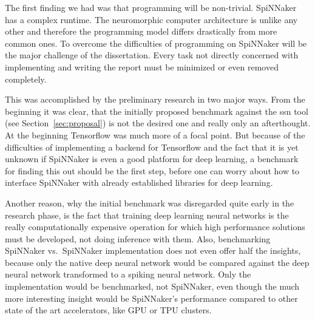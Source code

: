 \documentclass{article}
\begin{document}
The first finding we had was that programming will be
non-trivial.
SpiNNaker has a complex runtime.
The neuromorphic computer architecture is unlike any other
and therefore the programming model differs drastically
from more common ones.
To overcome the difficulties of programming on SpiNNaker
will be the major challenge of the dissertation.
Every task not directly concerned with implementing and writing the
report must be minimized or even removed completely.

This was accomplished by the preliminary research in two
major ways.
From the beginning it was clear, that the initially
proposed benchmark against the ssn tool (see
Section~\ref{sec:proposal}) is not the desired one and
really only an afterthought.
At the beginning Tensorflow was much more of a focal point.
But because of the difficulties of implementing a backend
for Tensorflow and the fact that it is yet unknown if
SpiNNaker is even a good platform for deep learning, a
benchmark for finding this out should be the first step,
before one can worry about how to interface SpiNNaker with
already established libraries for deep learning.

Another reason, why the initial benchmark was disregarded
quite early in the research phase, is the fact that
training deep learning neural networks is the really
computationally expensive operation for which high
performance solutions must be developed, not doing
inference with them.
Also, benchmarking SpiNNaker vs.\ SpiNNaker implementation
does not even offer half the insights, because only the
native deep neural network would be compared against the
deep neural network transformed to a spiking neural
network.
Only the implementation would be benchmarked, not
SpiNNaker, even though the much more interesting insight
would be SpiNNaker's performance compared to other state
of the art accelerators, like GPU or TPU clusters.
\end{document}
